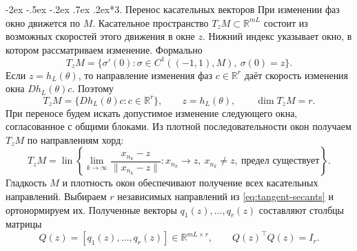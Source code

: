 \documentclass[11pt,a4paper]{article}
\makeatletter
\renewcommand\section{\@startsection{section}{1}{\z@}%
  {-2ex \@plus -.5ex \@minus -.2ex}%
  {.7ex \@plus .2ex}{\normalfont\Large\bfseries}}
\makeatother
\begin{document}
\section*{3. Перенос касательных векторов}
При изменении фаз окно движется по $M$.
Касательное пространство $T_zM\subset\mathbb R^{mL}$ состоит из возможных
скоростей этого движения в окне $z$. Нижний индекс указывает окно,
в котором рассматриваем изменение. Формально
$$
T_zM=\{\sigma'(0):\sigma\in C^1((-1,1),M),\ \sigma(0)=z\}.
$$
Если $z=h_L(\theta)$, то направление изменения фаз $c\in\mathbb R^r$
даёт скорость изменения окна $Dh_L(\theta)c$. Поэтому
$$
T_zM=\{Dh_L(\theta)c:c\in\mathbb R^r\},\qquad
z=h_L(\theta),\qquad \dim T_zM=r.
$$
При переносе будем искать допустимое изменение следующего окна,
согласованное с общими блоками.
Из плотной последовательности окон получаем $T_zM$ по направлениям хорд:
\begin{equation}
T_zM=\operatorname{lin}\left\{
\lim_{k\to\infty}\frac{x_{n_k}-z}{\|x_{n_k}-z\|}:
x_{n_k}\to z,\ x_{n_k}\ne z,\ \text{предел существует}
\right\}.
\label{eq:tangent-secants}
\end{equation}
Гладкость $M$ и плотность окон обеспечивают получение всех касательных направлений.
Выбираем $r$ независимых направлений из \eqref{eq:tangent-secants}
и ортонормируем их. Полученные векторы $q_1(z),\ldots,q_r(z)$
составляют столбцы матрицы
\begin{equation}
Q(z)=[q_1(z),\ldots,q_r(z)]\in\mathbb R^{mL\times r},\qquad
Q(z)^\top Q(z)=I_r.
\label{eq:tangent-basis}
\end{equation}
\end{document}
